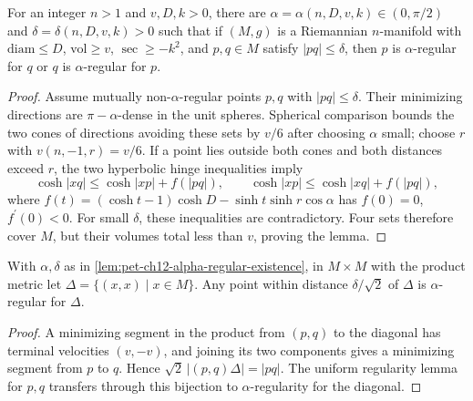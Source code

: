 \begin{lemma}
  \label{lem:pet-ch12-alpha-regular-existence}

  For an integer $n>1$ and $v,D,k>0$, there are
  $\alpha=\alpha(n,D,v,k)\in(0,\pi/2)$ and $\delta=\delta(n,D,v,k)>0$ such that
  if $(M,g)$ is a Riemannian $n$-manifold with $\mathrm{diam}\le D$,
  $\mathrm{vol}\ge v$, $\sec\ge-k^2$, and $p,q\in M$ satisfy $|pq|\le\delta$,
  then $p$ is $\alpha$-regular for $q$ or $q$ is $\alpha$-regular for $p$.
\end{lemma}
\begin{proof}
  \sketch
  Assume mutually non-\(\alpha\)-regular points \(p,q\) with \( |pq|\le\delta\).
  Their minimizing directions are \(\pi-\alpha\)-dense in the unit spheres.
  Spherical comparison bounds the two cones of directions avoiding these sets
  by \(v/6\) after choosing \(\alpha\) small; choose \(r\) with
  \(v(n,-1,r)=v/6\). If a point lies outside both cones and both distances
  exceed \(r\), the two hyperbolic hinge inequalities imply
  \[\cosh|xq|\le\cosh|xp|+f(|pq|),\qquad
    \cosh|xp|\le\cosh|xq|+f(|pq|),\]
  where \(f(t)=(\cosh t-1)\cosh D-\sinh t\sinh r\cos\alpha\) has
  \(f(0)=0\), \(f^{\prime}(0)<0\). For small \(\delta\), these inequalities are
  contradictory. Four sets therefore cover \(M\), but their volumes total less
  than \(v\), proving the lemma.
\end{proof}

\begin{corollary}
  \label{cor:pet-ch12-diagonal-alpha-regular}

  With $\alpha,\delta$ as in \cref{lem:pet-ch12-alpha-regular-existence}, in
  $M\times M$ with the product metric let $\Delta=\{(x,x)\mid x\in M\}$. Any
  point within distance $\delta/\sqrt2$ of $\Delta$ is $\alpha$-regular for
  $\Delta$.
\end{corollary}
\begin{proof}
  \sketch
  A minimizing segment in the product from \((p,q)\) to the diagonal has
  terminal velocities \((v,-v)\), and joining its two components gives a
  minimizing segment from \(p\) to \(q\). Hence \(\sqrt2\,|(p,q)\Delta|=|pq|\).
  The uniform regularity lemma for \(p,q\) transfers through this bijection to
  \(\alpha\)-regularity for the diagonal.
\end{proof}

